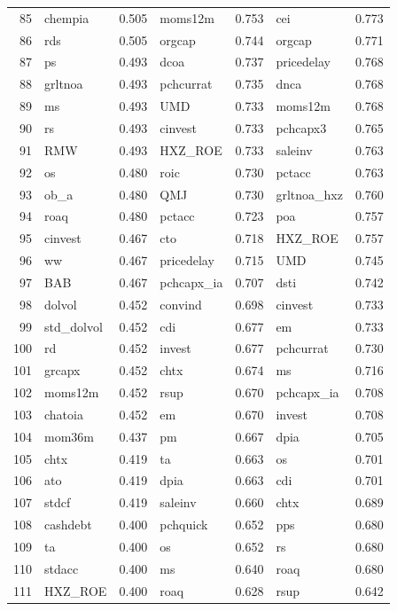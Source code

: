 \begin{footnotesize}
\begin{longtable}{r|lc|lc|lc}
  85 & chempia & 0.505 & moms12m & 0.753 & cei & 0.773 \\ 
  86 & rds & 0.505 & orgcap & 0.744 & orgcap & 0.771 \\ 
  87 & ps & 0.493 & dcoa & 0.737 & pricedelay & 0.768 \\ 
  88 & grltnoa & 0.493 & pchcurrat & 0.735 & dnca & 0.768 \\ 
  89 & ms & 0.493 & UMD & 0.733 & moms12m & 0.768 \\ 
  90 & rs & 0.493 & cinvest & 0.733 & pchcapx3 & 0.765 \\ 
  91 & RMW & 0.493 & HXZ\_ROE & 0.733 & saleinv & 0.763 \\ 
  92 & os & 0.480 & roic & 0.730 & pctacc & 0.763 \\ 
  93 & ob\_a & 0.480 & QMJ & 0.730 & grltnoa\_hxz & 0.760 \\ 
  94 & roaq & 0.480 & pctacc & 0.723 & poa & 0.757 \\ 
  95 & cinvest & 0.467 & cto & 0.718 & HXZ\_ROE & 0.757 \\ 
  96 & ww & 0.467 & pricedelay & 0.715 & UMD & 0.745 \\ 
  97 & BAB & 0.467 & pchcapx\_ia & 0.707 & dsti & 0.742 \\ 
  98 & dolvol & 0.452 & convind & 0.698 & cinvest & 0.733 \\ 
  99 & std\_dolvol & 0.452 & cdi & 0.677 & em & 0.733 \\ 
  100 & rd & 0.452 & invest & 0.677 & pchcurrat & 0.730 \\ 
  101 & grcapx & 0.452 & chtx & 0.674 & ms & 0.716 \\ 
  102 & moms12m & 0.452 & rsup & 0.670 & pchcapx\_ia & 0.708 \\ 
  103 & chatoia & 0.452 & em & 0.670 & invest & 0.708 \\ 
  104 & mom36m & 0.437 & pm & 0.667 & dpia & 0.705 \\ 
  105 & chtx & 0.419 & ta & 0.663 & os & 0.701 \\ 
  106 & ato & 0.419 & dpia & 0.663 & cdi & 0.701 \\ 
  107 & stdcf & 0.419 & saleinv & 0.660 & chtx & 0.689 \\ 
  108 & cashdebt & 0.400 & pchquick & 0.652 & pps & 0.680 \\ 
  109 & ta & 0.400 & os & 0.652 & rs & 0.680 \\ 
  110 & stdacc & 0.400 & ms & 0.640 & roaq & 0.680 \\ 
  111 & HXZ\_ROE & 0.400 & roaq & 0.628 & rsup & 0.642 \\ 

\end{longtable}
\end{footnotesize}
